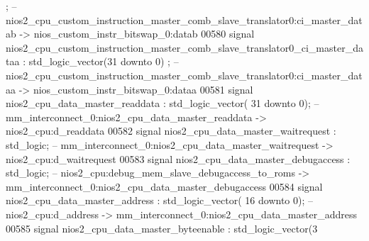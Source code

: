 \begin{DoxyCode}
      ;\textcolor{keyword}{ -- nios2\_cpu\_custom\_instruction\_master\_comb\_slave\_translator0:ci\_master\_datab ->
       nios\_custom\_instr\_bitswap\_0:datab}
00580     \textcolor{keywordflow}{signal} \textcolor{vhdlchar}{
      nios2_cpu_custom_instruction_master_comb_slave_translator0_ci_master_dataa}  \textcolor{vhdlchar}{:} \textcolor{comment}{std\_logic\_vector}\textcolor{vhdlchar}{(}\textcolor{vhdllogic}{}\textcolor{vhdllogic}{31} \textcolor{keywordflow}{downto} \textcolor{vhdllogic}{}\textcolor{vhdllogic}{0}\textcolor{vhdlchar}{)}
      ;\textcolor{keyword}{ -- nios2\_cpu\_custom\_instruction\_master\_comb\_slave\_translator0:ci\_master\_dataa ->
       nios\_custom\_instr\_bitswap\_0:dataa}
00581     \textcolor{keywordflow}{signal} \textcolor{vhdlchar}{nios2_cpu_data_master_readdata}                                              \textcolor{vhdlchar}{:} \textcolor{comment}{std\_logic\_vector}\textcolor{vhdlchar}{(}\textcolor{vhdllogic}{}\textcolor{vhdllogic}{
      31} \textcolor{keywordflow}{downto} \textcolor{vhdllogic}{}\textcolor{vhdllogic}{0}\textcolor{vhdlchar}{)};\textcolor{keyword}{ -- mm\_interconnect\_0:nios2\_cpu\_data\_master\_readdata -> nios2\_cpu:d\_readdata}
00582     \textcolor{keywordflow}{signal} \textcolor{vhdlchar}{nios2_cpu_data_master_waitrequest}                                           \textcolor{vhdlchar}{:} \textcolor{comment}{std\_logic};\textcolor{keyword}{        
                   -- mm\_interconnect\_0:nios2\_cpu\_data\_master\_waitrequest -> nios2\_cpu:d\_waitrequest}
00583     \textcolor{keywordflow}{signal} \textcolor{vhdlchar}{nios2_cpu_data_master_debugaccess}                                           \textcolor{vhdlchar}{:} \textcolor{comment}{std\_logic};\textcolor{keyword}{        
                   -- nios2\_cpu:debug\_mem\_slave\_debugaccess\_to\_roms ->
       mm\_interconnect\_0:nios2\_cpu\_data\_master\_debugaccess}
00584     \textcolor{keywordflow}{signal} \textcolor{vhdlchar}{nios2_cpu_data_master_address}                                               \textcolor{vhdlchar}{:} \textcolor{comment}{std\_logic\_vector}\textcolor{vhdlchar}{(}\textcolor{vhdllogic}{}\textcolor{vhdllogic}{
      16} \textcolor{keywordflow}{downto} \textcolor{vhdllogic}{}\textcolor{vhdllogic}{0}\textcolor{vhdlchar}{)};\textcolor{keyword}{ -- nios2\_cpu:d\_address -> mm\_interconnect\_0:nios2\_cpu\_data\_master\_address}
00585     \textcolor{keywordflow}{signal} \textcolor{vhdlchar}{nios2_cpu_data_master_byteenable}                                            \textcolor{vhdlchar}{:} \textcolor{comment}{std\_logic\_vector}\textcolor{vhdlchar}{(}\textcolor{vhdllogic}{}\textcolor{vhdllogic}{3}

\end{DoxyCode}
